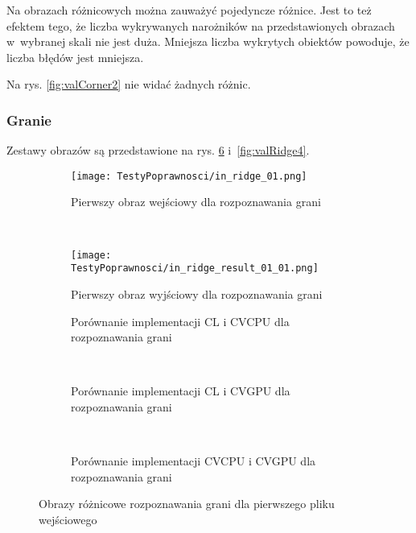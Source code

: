 Na obrazach różnicowych można zauważyć pojedyncze różnice. Jest to też efektem tego, że liczba wykrywanych narożników na przedstawionych obrazach w~wybranej skali nie jest duża. Mniejsza liczba wykrytych obiektów powoduje, że liczba błędów jest mniejsza.

Na rys. \ref{fig:valCorner2} nie widać żadnych różnic.

\subsubsection{Granie}
\label{subsubsec:granieRysunki}

Zestawy obrazów są przedstawione na rys. \ref{fig:valRidge1} i~\ref{fig:valRidge4}. 

\begin{figure}[h]

\begin{center}
\begin{subfigure}[t]{0.3\textwidth}
\texttt{[image: TestyPoprawnosci/in\_ridge\_01.png]}
\caption{Pierwszy obraz wejściowy dla rozpoznawania grani}
\label{fig:valRidge01}
\end{subfigure}
~
\begin{subfigure}[t]{0.3\textwidth}
\texttt{[image: TestyPoprawnosci/in\_ridge\_result\_01\_01.png]}
\caption{Pierwszy obraz wyjściowy dla rozpoznawania grani}
\label{fig:valRidgeResult01}
\end{subfigure}
\end{center}

\begin{subfigure}[t]{0.3\textwidth}
	\centering
	\setlength\fboxsep{0pt}
	\setlength\fboxrule{0.5pt}
	\caption{Porównanie implementacji CL i CVCPU dla rozpoznawania grani}
	\label{fig:valRidge1CLCVCPU}
\end{subfigure}
~
\begin{subfigure}[t]{0.3\textwidth}
	\centering
	\setlength\fboxsep{0pt}
	\setlength\fboxrule{0.5pt}
	\caption{Porównanie implementacji CL i CVGPU dla rozpoznawania grani}
	\label{fig:valRidge1CLCVGPU}
\end{subfigure}
~
\begin{subfigure}[t]{0.3\textwidth}
	\centering
	\setlength\fboxsep{0pt}
	\setlength\fboxrule{0.5pt}
	\caption{Porównanie implementacji CVCPU i CVGPU dla rozpoznawania grani}
	\label{fig:valRidge1CVCPUCVGPU}                 
\end{subfigure}
\caption{Obrazy różnicowe rozpoznawania grani dla pierwszego pliku wejściowego}

\label{fig:valRidge1}
\end{figure}

